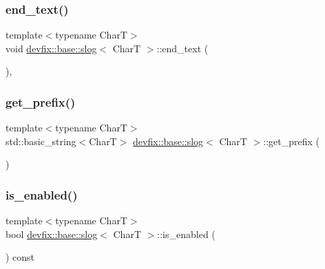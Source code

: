 \subsubsection{\texorpdfstring{end\+\_\+text()}{end\_text()}}
{\footnotesize\ttfamily template$<$typename CharT$>$ \\
void \hyperlink{structdevfix_1_1base_1_1slog}{devfix\+::base\+::slog}$<$ CharT $>$\+::end\+\_\+text (\begin{DoxyParamCaption}{ }\end{DoxyParamCaption})\hspace{0.3cm}{\ttfamily [inline]}, {\ttfamily [protected]}}

\mbox{\label{structdevfix_1_1base_1_1slog_a692072f9ce3409f287c4f1f57fdf0e99}} 
\subsubsection{\texorpdfstring{get\+\_\+prefix()}{get\_prefix()}}
{\footnotesize\ttfamily template$<$typename CharT$>$ \\
std\+::basic\+\_\+string$<$CharT$>$ \hyperlink{structdevfix_1_1base_1_1slog}{devfix\+::base\+::slog}$<$ CharT $>$\+::get\+\_\+prefix (\begin{DoxyParamCaption}{ }\end{DoxyParamCaption})\hspace{0.3cm}{\ttfamily [inline]}}

\mbox{\label{structdevfix_1_1base_1_1slog_ae17c8415ef92091f6b7741919c4f6cdb}} 
\subsubsection{\texorpdfstring{is\+\_\+enabled()}{is\_enabled()}}
{\footnotesize\ttfamily template$<$typename CharT$>$ \\
bool \hyperlink{structdevfix_1_1base_1_1slog}{devfix\+::base\+::slog}$<$ CharT $>$\+::is\+\_\+enabled (\begin{DoxyParamCaption}{ }\end{DoxyParamCaption}) const\hspace{0.3cm}{\ttfamily [inline]}}

